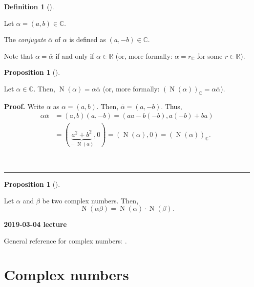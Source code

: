 \documentclass[numbers=enddot,12pt,final,onecolumn,notitlepage]{scrartcl}%
\numberwithin{exer}{subsection}
\theoremstyle{definition}
\newtheorem{prop}[theo]{Proposition}
\newenvironment{proposition}[1][]
{\begin{prop}[#1]\begin{leftbar}}
{\end{leftbar}\end{prop}}
\newtheorem{defi}[theo]{Definition}
\newenvironment{definition}[1][]
{\begin{defi}[#1]\begin{leftbar}}
{\end{leftbar}\end{defi}}
\newenvironment{proof}[1][Proof]{\noindent\textbf{#1.} }{\ \rule{0.5em}{0.5em}}
\begin{document}
\begin{definition}
Let $\alpha=\left(  a,b\right)  \in\mathbb{C}$.

The \textit{conjugate} $\overline{\alpha}$ of $\alpha$ is defined as $\left(
a,-b\right)  \in\mathbb{C}$.
\end{definition}

Note that $\alpha=\overline{\alpha}$ if and only if $\alpha\in\mathbb{R}$ (or,
more formally: $\alpha=r_{\mathbb{C}}$ for some $r\in\mathbb{R}$).

\begin{proposition}
Let $\alpha\in\mathbb{C}$. Then, $\operatorname*{N}\left(  \alpha\right)
=\alpha\overline{\alpha}$ (or, more formally: $\left(  \operatorname*{N}%
\left(  \alpha\right)  \right)  _{\mathbb{C}}=\alpha\overline{\alpha}$).
\end{proposition}

\begin{proof}
Write $\alpha$ as $\alpha=\left(  a,b\right)  $. Then, $\overline{\alpha
}=\left(  a,-b\right)  $. Thus,%
\begin{align*}
\alpha\overline{\alpha}  &  =\left(  a,b\right)  \left(  a,-b\right)  =\left(
aa-b\left(  -b\right)  ,a\left(  -b\right)  +ba\right) \\
&  =\left(  \underbrace{a^{2}+b^{2}}_{=\operatorname*{N}\left(  \alpha\right)
},0\right)  =\left(  \operatorname*{N}\left(  \alpha\right)  ,0\right)
=\left(  \operatorname*{N}\left(  \alpha\right)  \right)  _{\mathbb{C}}.
\end{align*}

\end{proof}

\begin{proposition}
Let $\alpha$ and $\beta$ be two complex numbers. Then,%
\[
\operatorname*{N}\left(  \alpha\beta\right)  =\operatorname*{N}\left(
\alpha\right)  \cdot\operatorname*{N}\left(  \beta\right)  .
\]

\end{proposition}

\begin{center}
\textbf{2019-03-04 lecture}
\end{center}

General reference for complex numbers: \cite{LaNaSc16}.

\section{Complex numbers}
\end{document}
